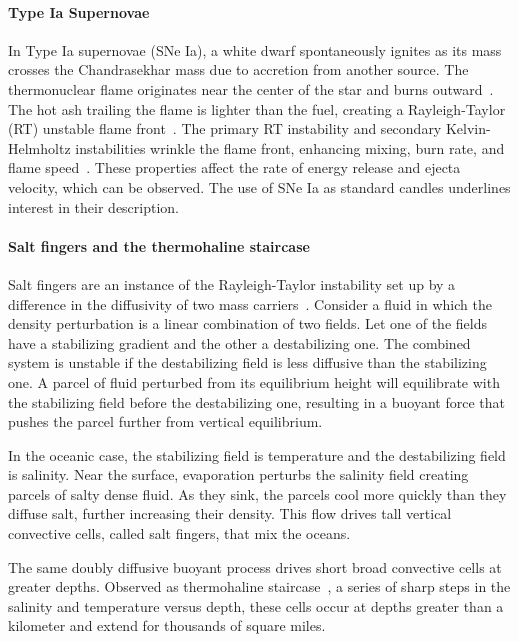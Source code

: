 \paragraph{Type Ia Supernovae}
In Type Ia supernovae (SNe Ia), a white dwarf spontaneously ignites as its mass crosses the Chandrasekhar mass due to accretion from another source.
The thermonuclear flame originates near the center of the star and burns outward~\cite{oran2007origins}.
The hot ash trailing the flame is lighter than the fuel, creating a Rayleigh-Taylor (RT) unstable flame front~\cite{Zingale2005}.
The primary RT instability and secondary Kelvin-Helmholtz instabilities wrinkle the flame front, enhancing mixing, burn rate, and flame speed~\cite{hicks2015rayleigh}.
These properties affect the rate of energy release and ejecta velocity, which can be observed.
The use of SNe Ia as standard candles underlines interest in their description.

\paragraph{Salt fingers and the thermohaline staircase}
Salt fingers are an instance of the Rayleigh-Taylor instability set up by a difference in the diffusivity of two mass carriers~\cite{Stern1969, Linden1973}.
Consider a fluid in which the density perturbation is a linear combination of two fields.
Let one of the fields have a stabilizing gradient and the other a destabilizing one.
The combined system is unstable if the destabilizing field is less diffusive than the stabilizing one.
A parcel of fluid perturbed from its equilibrium height will equilibrate with the stabilizing field before the destabilizing one, resulting in a buoyant force that pushes the parcel further from vertical equilibrium.

In the oceanic case, the stabilizing field is temperature and the destabilizing field is salinity.
Near the surface, evaporation perturbs the salinity field creating parcels of salty dense fluid.
As they sink, the parcels cool more quickly than they diffuse salt, further increasing their density.
This flow drives tall vertical convective cells, called salt fingers, that mix the oceans.

The same doubly diffusive buoyant process drives short broad convective cells at greater depths.
Observed as thermohaline staircase~\cite{Tait1971}, a series of sharp steps in the salinity and temperature versus depth, these cells occur at depths greater than a kilometer and extend for thousands of square miles.

